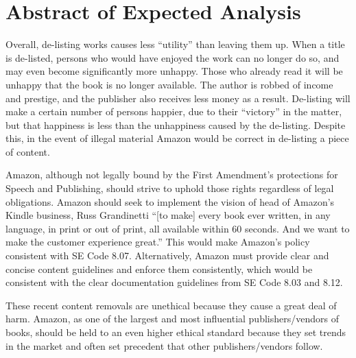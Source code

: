 \documentclass[12pt]{article}
\begin{document}
\section{Abstract of Expected Analysis}
Overall, de-listing works causes less ``utility'' than leaving them up.  When a title is de-listed, persons who would have enjoyed the work can no longer do so, and may even become significantly more unhappy.  Those who already read it will be unhappy that the book is no longer available.  The author is robbed of income and prestige, and the publisher also receives less money as a result.  De-listing will make a certain number of persons happier, due to their ``victory'' in the matter, but that happiness is less than the unhappiness caused by the de-listing.  Despite this, in the event of illegal material Amazon would be correct in de-listing a piece of content.

Amazon, although not legally bound by the First Amendment's protections for Speech and Publishing, should strive to uphold those rights regardless of legal obligations.  Amazon should seek to implement the vision of head of Amazon's Kindle business, Russ Grandinetti ``[to make] every book ever written, in any language, in print or out of print, all available within 60 seconds. And we want to make the customer experience great.'' This would make Amazon's policy consistent with SE Code 8.07.  Alternatively, Amazon must provide clear and concise content guidelines and enforce them consistently, which would be consistent with the clear documentation guidelines from SE Code 8.03 and 8.12.

These recent content removals are unethical because they cause a great deal of harm.  Amazon, as one of the largest and most influential publishers/vendors of books, should be held to an even higher ethical standard because they set trends in the market and often set precedent that other publishers/vendors follow.

\nocite{*}




\end{document}
